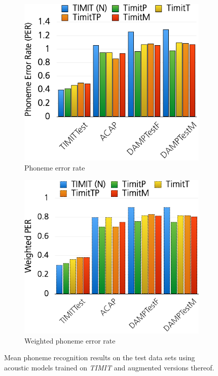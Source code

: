 \begin{figure}
	\centering
	\begin{subfigure}[t]{0.4\textwidth}
		\includegraphics[width=\textwidth]{images/res_songify_per.png}
		\caption{Phoneme error rate}
		
	\end{subfigure}%
	\begin{subfigure}[t]{0.4\textwidth}
		\includegraphics[width=\textwidth]{images/res_songify_wper.png}
		\caption{Weighted phoneme error rate}
	\end{subfigure}
	\caption{Mean phoneme recognition results on the test data sets using acoustic models trained on \textit{TIMIT} and augmented versions thereof.}\label{fig:res_songify}
\end{figure}
